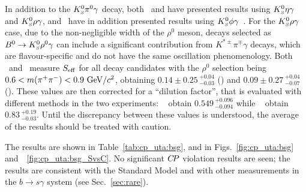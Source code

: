 In addition to the $K^0_{\scriptscriptstyle S}\pi^0\gamma$ decay, both \babar\ and \belle have presented results using $K^0_{\scriptscriptstyle S}\eta\gamma$ and $K^0_{\scriptscriptstyle S}\rho\gamma$, and \belle\ have in addition presented results using $K^0_{\scriptscriptstyle S}\phi\gamma$~\cite{Sahoo:2011zd}.
For the $K^0_{\scriptscriptstyle S}\rho\gamma$ case, due to the non-negligible width of the $\rho^0$ meson, decays selected as $B^0 \to K^0_{\scriptscriptstyle S}\rho^0\gamma$ can include a significant contribution from $K^{*\pm}\pi^\mp\gamma$ decays, which are flavour-specific and do not have the same oscillation phenomenology. 
Both \babar\ and \belle\ measure $S_{\rm eff}$ for all \B decay candidates with the $\rho^0$ selection being $0.6 < m(\pi^+\pi^-) < 0.9 \ {\rm GeV}/c^2$, obtaining $0.14 \pm 0.25 \,^{+0.04}_{-0.03}$ (\babar) and $0.09 \pm 0.27 \,^{+0.04}_{-0.07}$ (\belle). These values are then corrected for a ``dilution factor'', that is evaluated with different methods in the two experiments: \babar~\cite{Akar:2013ima} obtain $0.549 \,^{+0.096}_{-0.094}$ while \belle~\cite{Li:2008qma} obtain $0.83 \,^{+0.19}_{-0.03}$. Until the discrepancy between these values is understood, the average of the results should be treated with caution.




The results are shown in Table~\ref{tab:cp_uta:bsg},
and in Figs.~\ref{fig:cp_uta:bsg} and~~\ref{fig:cp_uta:bsg_SvsC}.
No significant $C\!P$ violation results are seen;
the results are consistent with the Standard Model
and with other measurements in the $b \to s\gamma$ system (see Sec.~\ref{sec:rare}).

